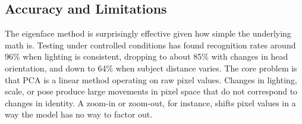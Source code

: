 \documentclass[12pt,a4paper]{article}
\begin{document}
\subsection{Accuracy and Limitations}

The eigenface method is surprisingly effective given how simple the underlying
math is. Testing under controlled conditions has found recognition rates around
96\% when lighting is consistent, dropping to about 85\% with changes in
head orientation, and down to 64\% when subject distance varies. The core
problem is that PCA is a linear method operating on raw pixel values. Changes
in lighting, scale, or pose produce large movements in pixel space that do
not correspond to changes in identity. A zoom-in or zoom-out, for instance,
shifts pixel values in a way the model has no way to factor out.
\end{document}
